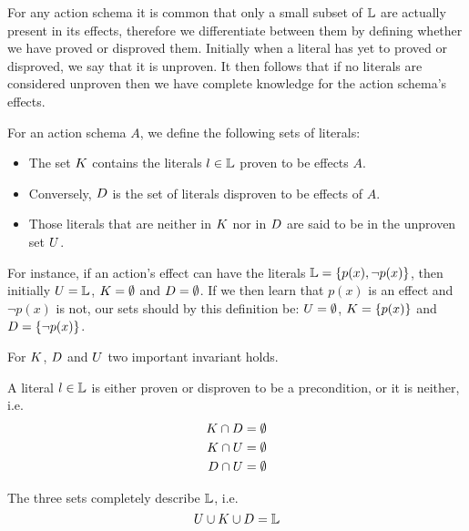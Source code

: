 \documentclass[../Master.tex]{subfiles}
\begin{document}
For any action schema it is common that only a small subset of $\mathbb{L}$ are actually present in its effects, 
therefore we differentiate between them by defining whether we have proved or disproved them. 
Initially when a literal has yet to proved or disproved, we say that it is unproven. 
It then follows that if no literals are considered unproven then we have complete knowledge for the action schema's effects.


\begin{definition} 
    For an action schema $A$, we define the following sets of literals:
    \begin{itemize}
        \item The set $K$ contains the literals  $l \in \mathbb{L}$ proven to be effects $A$.
        \item Conversely, $D$ is the set of literals disproven to be effects of $A$.
        \item Those literals that are neither in $K$ nor in $D$ are said to be in the unproven set $U$.
    \end{itemize}
	For instance, if an action's effect can have the literals $\mathbb{L} = \{p(x), \neg p(x)\}$, 
	then initially $U = \mathbb{L}$, $K = \emptyset$ and $D = \emptyset$. 
	If we then learn that $p(x)$ is an effect and $\neg p(x)$ is not, 
	our sets should by this definition be: $U = \emptyset$, $K = \{p(x)\}$ and $D = \{\neg p(x)\}$. 
	
\end{definition}

For $K$, $D$ and $U$ two important invariant holds.

\begin{invariant}\label{inv:nca:mutual-ex}
    A literal $l \in \mathbb{L}$ is either proven or disproven to be a precondition, or it is neither, i.e.\
	\begin{equation*}
		\begin{split}
		K \cap D & = \emptyset  \\ 
		K \cap U &= \emptyset \\
		D \cap U &= \emptyset
		\end{split}
	\end{equation*}
\end{invariant}

\begin{invariant}[Completeness]
    The three sets completely describe $\mathbb{L}$, i.e.\ 
	\begin{equation*}
		U \cup K \cup D = \mathbb{L}
	\end{equation*}
\end{invariant}
\end{document}
